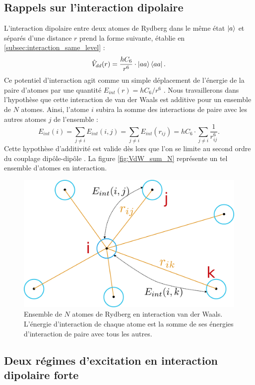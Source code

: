 	\subsection{Rappels sur l'interaction dipolaire}
\noindent L'interaction dipolaire entre deux atomes de Rydberg dans le même état $\ket{a}$ et séparés d'une distance $r$ prend la forme suivante, établie en \ref{subsec:interaction_same_level} :
\begin{equation}
\label{eq:Vdd_aa}
\hat{V}_{dd}(r) = \frac{hC_6}{r^6} \cdot \ket{aa}\bra{aa}.
\end{equation}
Ce potentiel d'interaction agit comme un simple déplacement de l'énergie de la paire d'atomes par une quantité $E_{int} (r)=hC_6/r^6$ .
Nous travaillerons dans l'hypothèse que cette interaction de van der Waals est additive pour un ensemble de $N$ atomes.
Ainsi, l'atome $i$ subira la somme des interactions de paire avec les autres atomes $j$ de l'ensemble :
\begin{equation}
\label{eq:Eint_isum}
E_{int}(i) = \sum_{j\neq i} E_{int}(i,j) = \sum_{j\neq i} E_{int}(r_{ij}) = h C_6 \cdot \sum_{j \neq i} \frac{1}{r_{ij}^6}.
\end{equation}
Cette hypothèse d'additivité est valide dès lors que l'on se limite au second ordre du couplage dipôle-dipôle \cite{ENS_CHIPINTERACTION15,MX_TELLER_ADDITIVEVDW}.
La figure \eqref{fig:VdW_sum_N} représente un tel ensemble d'atomes en interaction.
%
\begin{figure}[h]
\centering
\includegraphics[width=0.6\linewidth]{figures/low_l/Natomes}
\caption[Ensemble de $N$ atomes de Rydberg en interaction van der Waals]
{Ensemble de $N$ atomes de Rydberg en interaction van der Waals.
L'énergie d'interaction de chaque atome est la somme de ses énergies d'interaction de paire avec tous les autres.
}
\label{fig:VdW_sum_N}
\end{figure}

	\subsection{Deux régimes d'excitation en interaction dipolaire forte}\label{subsec:excitation_bloc_facil}

